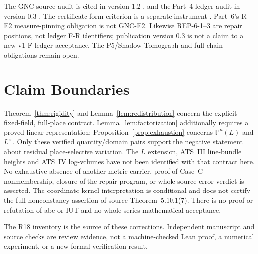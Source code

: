 \documentclass[11pt,a4paper]{article}
\theoremstyle{definition}
\theoremstyle{remark}
\begin{document}
The GNC source audit is cited in version 1.2 \cite{gnc}, and the
Part~4 ledger audit in version 0.3 \cite{part4}.
The certificate-form criterion is a separate instrument \cite{part2}.
Part~6's R-E2 measure-pinning obligation is not GNC-E2.
Likewise REP-6-1--3 are repair positions, not ledger F-R identifiers;
publication version 0.3 is not a claim to a new v1-F ledger acceptance.
The P5/Shadow Tomograph and full-chain obligations remain open.

\section{Claim Boundaries}\label{sec:claims}

Theorem~\ref{thm:rigidity} and Lemma~\ref{lem:redistribution} concern the
explicit fixed-field, full-place contract.
Lemma~\ref{lem:factorization} additionally requires a proved linear
representation; Proposition~\ref{prop:exhaustion} concerns
$\mathbb P^n(L)$ and $L^\times$.
Only these verified quantity/domain pairs support the negative statement
about residual place-selective variation.
The $\overline L$ extension, ATS~III line-bundle heights and ATS~IV
log-volumes have not been identified with that contract here.
No exhaustive absence of another metric carrier, proof of Case~C
nonmembership, closure of the repair program, or whole-source error
verdict is asserted. The coordinate-kernel interpretation is conditional
and does not certify the full nonconstancy assertion of source
Theorem~5.10.1(7). There is no proof or refutation of abc or IUT and no
whole-series mathematical acceptance.

The R18 inventory is the source of these corrections.
Independent manuscript and source checks are review evidence, not a
machine-checked Lean proof, a numerical experiment, or a new formal
verification result.


\end{document}
